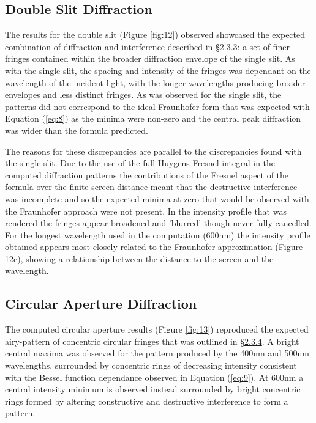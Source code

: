 \documentclass[12pt]{article}
\begin{document}
\subsection{Double Slit Diffraction}

The results for the double slit (Figure \ref{fig:12}) observed showcased the expected combination of diffraction and interference described in \hyperref[sec:2.3.3]{§2.3.3}: a set of finer fringes contained within the broader diffraction envelope of the single slit.
As with the single slit, the spacing and intensity of the fringes was dependant on the wavelength of the incident light, with the longer wavelengths producing broader envelopes and less distinct fringes.
As was observed for the single slit, the patterns did not correspond to the ideal Fraunhofer form that was expected with Equation (\ref{eq:8}) as the minima were non-zero and the central peak diffraction was wider than the formula predicted.

The reasons for these discrepancies are parallel to the discrepancies found with the single slit. Due to the use of the full Huygens-Fresnel integral in the computed diffraction patterns
the contributions of the Fresnel aspect of the formula over the finite screen distance meant that the destructive interference was incomplete and so the expected minima at zero that would be observed with the Fraunhofer approach were not present.
In the intensity profile that was rendered the fringes appear broadened and 'blurred' though never fully cancelled. For the longest wavelength used in the computation (600nm) the intensity profile obtained appears most closely related to the Fraunhofer approximation (Figure \hyperref[fig:12c]{12c}),
showing a relationship between the distance to the screen and the wavelength.

\subsection{Circular Aperture Diffraction}

The computed circular aperture results (Figure \ref{fig:13}) reproduced the expected airy-pattern of concentric circular fringes that was outlined in \hyperref[sec:2.3.4]{§2.3.4}. A bright central maxima was observed for the pattern produced by the 400nm and 500nm wavelengths,
surrounded by concentric rings of decreasing intensity consistent with the Bessel function dependance observed in Equation (\ref{eq:9}). At 600nm a central intensity minimum is observed
instead surrounded by bright concentric rings formed by altering constructive and destructive interference to form a pattern.
\end{document}

